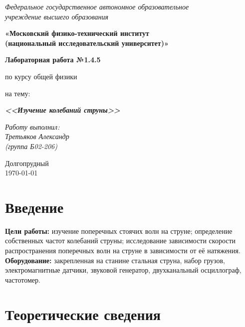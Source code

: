 \documentclass[a4paper,12pt]{article}
\begin{document}
	\begin{center}
		\textit{Федеральное государственное автономное образовательное\\ учреждение высшего образования }
		
		\vspace{0.5ex}
		
		\textbf{«Московский физико-технический институт\\ (национальный исследовательский университет)»}
	\end{center}
	
	\vspace{10ex}
	
	
	\begin{center}
		\vspace{13ex}
		
		\textbf{Лабораторная работа №1.4.5}
		
		\vspace{1ex}
		
		по курсу общей физики
		
		на тему:
		
		\textbf{\textit{<<Изучение колебаний струны>>}}
		
		\vspace{30ex}
		
		\begin{flushright}
			\noindent
			\textit{Работу выполнил:}\\  
			\textit{Третьяков Александр \\(группа Б02-206)}
		\end{flushright}
		\vfill
		Долгопрудный \\ \today
		
	\end{center}
	\newpage
	
	\section{Введение}
	
	\textbf{Цели работы:} изучение поперечных стоячих волн на струне; определение собственных частот колебаний струны; исследование зависимости скорости распространения поперечных волн на струне в зависимости от её натяжения.\\
	\textbf{Оборудование:} закрепленная на станине стальная струна, набор грузов,
	электромагнитные датчики, звуковой генератор, двухканальный осциллограф, частотомер.
	
	\section{Теоретические сведения}
	
\end{document}
